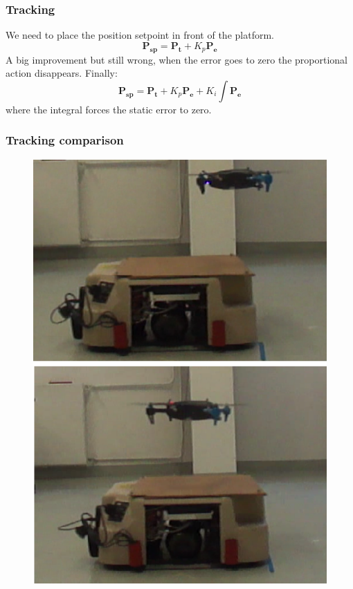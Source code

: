 \documentclass[xcolor=dvipsnames]{beamer}
\begin{document}
\begin{frame}
\frametitle{Tracking}
We need to place the position setpoint in front of the platform.
\begin{equation}
\boldsymbol{P_{sp}} = \boldsymbol{P_{t}} + K_p \boldsymbol{P_e} 
\label{eq:contr2}
\end{equation}
A big improvement but still wrong, when the error goes to zero the proportional action disappears. Finally:
\begin{equation}
\boldsymbol{P_{sp}} = \boldsymbol{P_{t}} + K_p \boldsymbol{P_e} +  K_i \int \boldsymbol{P_e}
\end{equation}
where the integral forces the static error to zero.
\end{frame}

\begin{frame}
\frametitle{Tracking comparison}
\begin{figure}
\includegraphics[height = 0.8\textheight]{f/trackcompare.png}
\end{figure}
\end{frame}
\end{document}
